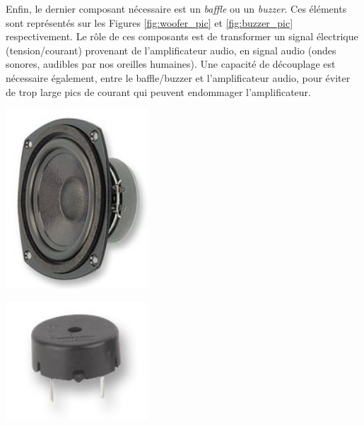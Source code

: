 
Enfin, le dernier composant nécessaire est un \emph{baffle} ou un \emph{buzzer}. Ces éléments sont représentés sur les Figures \ref{fig:woofer_pic} et \ref{fig:buzzer_pic} respectivement. Le rôle de ces composants est de transformer un signal électrique (tension/courant) provenant de l'amplificateur audio, en signal audio (ondes sonores, audibles par nos oreilles humaines). Une capacité de découplage est nécessaire également, entre le baffle/buzzer et l'amplificateur audio, pour éviter de trop large pics de courant qui peuvent endommager l'amplificateur.\\

\begin{minipage}[c]{0.45\textwidth}
	\centering
	\includegraphics[width=0.4\textwidth]{figures/woofer_picture.jpg}
	\label{fig:woofer_pic}
\end{minipage}
\hfill
\begin{minipage}[c]{0.45\textwidth}
	\centering
	\includegraphics[width=0.4\textwidth]{figures/buzzer_picture.jpg}
	\label{fig:buzzer_pic}
\end{minipage}
\vspace{1cm}